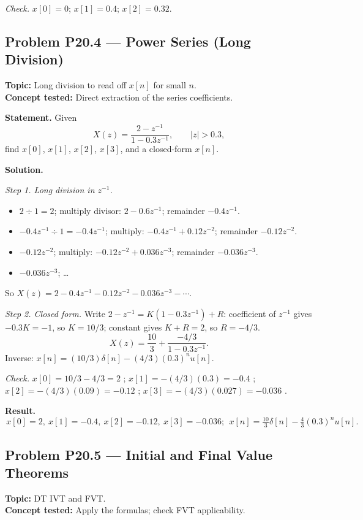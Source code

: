 \documentclass[11pt]{article}
\begin{document}
\textit{Check.} $x[0]=0$; $x[1]=0.4$; $x[2]=0.32$.

\subsection{Problem P20.4 --- Power Series (Long Division)}
\textbf{Topic:} Long division to read off $x[n]$ for small $n$.\\
\textbf{Concept tested:} Direct extraction of the series coefficients.

\textbf{Statement.} Given
\[
X(z) = \frac{2-z^{-1}}{1-0.3z^{-1}},\qquad |z|>0.3,
\]
find $x[0]$, $x[1]$, $x[2]$, $x[3]$, and a closed-form $x[n]$.

\textbf{Solution.}

\textit{Step 1. Long division in $z^{-1}$.}
\begin{itemize}
\item $2 \div 1 = 2$; multiply divisor: $2 - 0.6z^{-1}$; remainder $-0.4z^{-1}$.
\item $-0.4z^{-1}\div 1 = -0.4z^{-1}$; multiply: $-0.4z^{-1}+0.12z^{-2}$; remainder $-0.12z^{-2}$.
\item $-0.12z^{-2}$; multiply: $-0.12z^{-2}+0.036z^{-3}$; remainder $-0.036z^{-3}$.
\item $-0.036z^{-3}$; \ldots
\end{itemize}
So $X(z) = 2 - 0.4z^{-1} - 0.12z^{-2} - 0.036z^{-3} - \cdots$.

\textit{Step 2. Closed form.} Write $2 - z^{-1} = K(1-0.3z^{-1}) + R$:
coefficient of $z^{-1}$ gives $-0.3K = -1$, so $K = 10/3$;
constant gives $K+R=2$, so $R=-4/3$.
\[
X(z) = \frac{10}{3} + \frac{-4/3}{1-0.3z^{-1}}.
\]
Inverse: $x[n] = (10/3)\delta[n] - (4/3)(0.3)^{n}u[n]$.

\textit{Check.} $x[0] = 10/3-4/3 = 2$ \checkmark;
$x[1]=-(4/3)(0.3)=-0.4$ \checkmark;
$x[2]=-(4/3)(0.09)=-0.12$ \checkmark;
$x[3]=-(4/3)(0.027)=-0.036$ \checkmark.

\textbf{Result.}
\[
\boxed{\,x[0]=2,\ x[1]=-0.4,\ x[2]=-0.12,\ x[3]=-0.036;\ \ x[n] = \tfrac{10}{3}\delta[n]-\tfrac{4}{3}(0.3)^{n}u[n].\,}
\]

\subsection{Problem P20.5 --- Initial and Final Value Theorems}
\textbf{Topic:} DT IVT and FVT.\\
\textbf{Concept tested:} Apply the formulas; check FVT applicability.
\end{document}
